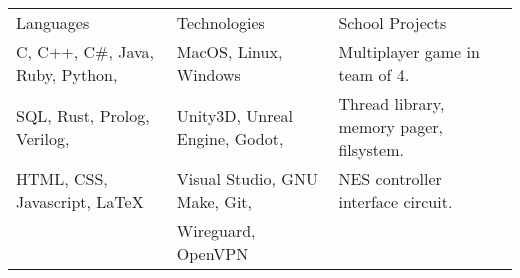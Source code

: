 \documentclass[11pt]{article}
\renewcommand{\section}[1]{{\LARGE{#1}}\vspace{2 mm}}
\begin{document}
\begin{tabular}{l l l}
  \section{Languages} & \section{Technologies} & \section{School Projects} \\

  C, C++, C\#, Java, Ruby, Python,
  &
  MacOS, Linux, Windows
  &
  Multiplayer game in team of 4.
  \\

  SQL, Rust, Prolog, Verilog,
  &
  Unity3D, Unreal Engine, Godot,
  &
  Thread library, memory pager, filsystem.
  \\

  HTML, CSS, Javascript, \LaTeX
  &
  Visual Studio, GNU Make, Git,
  &
  NES controller interface circuit.
  \\


  &
  Wireguard, OpenVPN
  &
  \\
\end{tabular}
\end{document}
